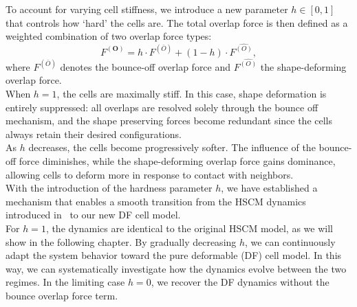 To account for varying cell stiffness, we introduce a new parameter $h \in [0, 1]$ that controls how `hard' the cells are. 
The total overlap force is then defined as a weighted combination of two overlap force types:
\[
F^{(\mathbf{O})} = h \cdot F^{(\bar{O})} + (1 - h) \cdot F^{\hat{(O)}},
\]
where $F^{(\bar{O})}$ denotes the bounce-off overlap force and $F^{\hat{(O)}}$ the shape-deforming overlap force.\\
When $h = 1$, the cells are maximally stiff. 
In this case, shape deformation is entirely suppressed: all overlaps are resolved solely through the bounce off mechanism, and the shape preserving forces become redundant since the cells always retain their desired configurations. \\
As $h$ decreases, the cells become progressively softer. 
The influence of the bounce-off force diminishes, while the shape-deforming overlap force gains dominance, allowing cells to deform more in response to contact with neighbors. \\
With the introduction of the hardness parameter $h$, we have established a mechanism that enables a smooth transition from the HSCM dynamics introduced in~\cite{Bruna2012} to our new DF cell model. \\
For $h = 1$, the dynamics are identical to the original HSCM model, as we will show in the following chapter. 
By gradually decreasing $h$, we can continuously adapt the system behavior toward the pure deformable (DF) cell model. 
In this way, we can systematically investigate how the dynamics evolve between the two regimes. 
In the limiting case $h = 0$, we recover the DF dynamics without the bounce overlap force term.

